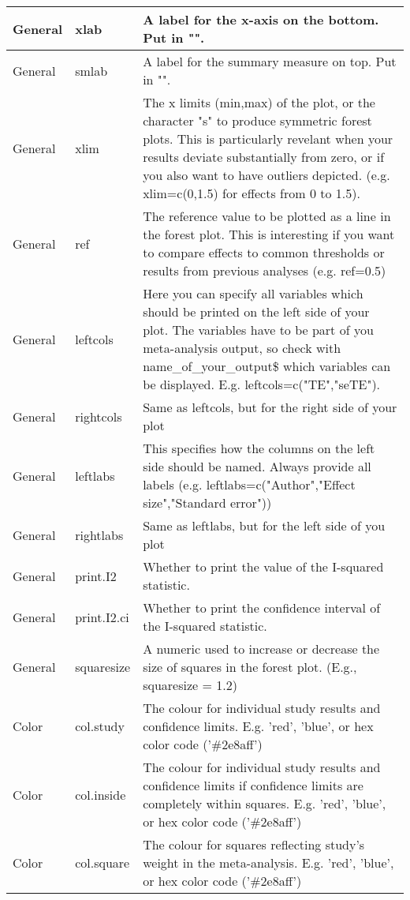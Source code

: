 \documentclass[]{book}
\theoremstyle{definition}
\theoremstyle{definition}
\theoremstyle{definition}
\theoremstyle{remark}
\begin{document}
\begin{tabular}{l|l|l}
\hline
General & xlab & A label for the x-axis on the bottom. Put in "".\\
\hline
General & smlab & A label for the summary measure on top. Put in "".\\
\hline
General & xlim & The x limits (min,max) of the plot, or the character "s" to produce symmetric forest plots. This is particularly revelant when your results deviate substantially from zero, or if you also want to have outliers depicted. (e.g. xlim=c(0,1.5) for effects from 0 to 1.5).\\
\hline
General & ref & The reference value to be plotted as a line in the forest plot. This is interesting if you want to compare effects to common thresholds or results from previous analyses (e.g. ref=0.5)\\
\hline
General & leftcols & Here you can specify all variables which should be printed on the left side of your plot. The variables have to be part of you meta-analysis output, so check with name\_of\_your\_output\$ which variables can be displayed. E.g. leftcols=c("TE","seTE").\\
\hline
General & rightcols & Same as leftcols, but for the right side of your plot\\
\hline
General & leftlabs & This specifies how the columns on the left side should be named. Always provide all labels (e.g. leftlabs=c("Author","Effect size","Standard error"))\\
\hline
General & rightlabs & Same as leftlabs, but for the left side of you plot\\
\hline
General & print.I2 & Whether to print the value of the I-squared statistic.\\
\hline
General & print.I2.ci & Whether to print the confidence interval of the I-squared statistic.\\
\hline
General & squaresize & A numeric used to increase or decrease the size of squares in the forest plot. (E.g., squaresize = 1.2)\\
\hline
Color & col.study & The colour for individual study results and confidence limits. E.g. 'red', 'blue', or hex color code ('\#2e8aff')\\
\hline
Color & col.inside & The colour for individual study results and confidence limits if confidence limits are completely within squares. E.g. 'red', 'blue', or hex color code ('\#2e8aff')\\
\hline
Color & col.square & The colour for squares reflecting study's weight in the meta-analysis. E.g. 'red', 'blue', or hex color code ('\#2e8aff')\\

\end{tabular}
\end{document}
